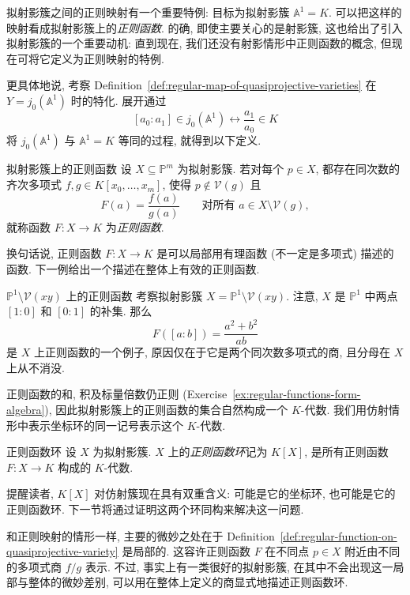 拟射影簇之间的正则映射有一个重要特例: 目标为拟射影簇 $\mathbb{A}^{1}=K$. 可以把这样的映射看成拟射影簇上的\emph{正则函数}. 的确, 即使主要关心的是射影簇, 这也给出了引入拟射影簇的一个重要动机: 直到现在, 我们还没有射影情形中正则函数的概念, 但现在可将它定义为正则映射的特例.

更具体地说, 考察 Definition~\ref{def:regular-map-of-quasiprojective-varieties} 在 $Y=j_{0}(\mathbb{A}^{1})$ 时的特化. 展开通过
\[
  [a_{0}:a_{1}]\in j_{0}(\mathbb{A}^{1})\longleftrightarrow\frac{a_{1}}{a_{0}}\in K
\]
将 $j_{0}(\mathbb{A}^{1})$ 与 $\mathbb{A}^{1}=K$ 等同的过程, 就得到以下定义.

\begin{Definition}{拟射影簇上的正则函数}\leavevmode\label{def:regular-function-on-quasiprojective-variety}
设 $X\subseteq\mathbb{P}^{m}$ 为拟射影簇. 若对每个 $p\in X$, 都存在同次数的齐次多项式 $f,g\in K[x_{0},\ldots,x_{m}]$, 使得 $p\notin\mathcal{V}(g)$ 且
\[
  F(a)=\frac{f(a)}{g(a)}\qquad\text{对所有 }a\in X\setminus\mathcal{V}(g),
\]
就称函数 $F:X\to K$ 为\emph{正则函数}.
\end{Definition}

换句话说, 正则函数 $F:X\to K$ 是可以局部用有理函数 (不一定是多项式) 描述的函数. 下一例给出一个描述在整体上有效的正则函数.

\begin{Example}{$\mathbb{P}^{1}\setminus\mathcal{V}(xy)$ 上的正则函数}\leavevmode\label{ex:regular-function-on-twice-punctured-projective-line}
考察拟射影簇 $X=\mathbb{P}^{1}\setminus\mathcal{V}(xy)$. 注意, $X$ 是 $\mathbb{P}^{1}$ 中两点 $[1:0]$ 和 $[0:1]$ 的补集. 那么
\[
  F([a:b])=\frac{a^{2}+b^{2}}{ab}
\]
是 $X$ 上正则函数的一个例子, 原因仅在于它是两个同次数多项式的商, 且分母在 $X$ 上从不消没.
\end{Example}

正则函数的和, 积及标量倍数仍正则 (Exercise~\ref{ex:regular-functions-form-algebra}), 因此拟射影簇上的正则函数的集合自然构成一个 $K$-代数. 我们用仿射情形中表示坐标环的同一记号表示这个 $K$-代数.

\begin{Definition}{正则函数环}\leavevmode\label{def:ring-of-regular-functions}
设 $X$ 为拟射影簇. $X$ 上的\emph{正则函数环}记为 $K[X]$, 是所有正则函数 $F:X\to K$ 构成的 $K$-代数.
\end{Definition}

提醒读者, $K[X]$ 对仿射簇现在具有双重含义: 可能是它的坐标环, 也可能是它的正则函数环. 下一节将通过证明这两个环同构来解决这一问题.

和正则映射的情形一样, 主要的微妙之处在于 Definition~\ref{def:regular-function-on-quasiprojective-variety} 是局部的. 这容许正则函数 $F$ 在不同点 $p\in X$ 附近由不同的多项式商 $f/g$ 表示. 不过, 事实上有一类很好的拟射影簇, 在其中不会出现这一局部与整体的微妙差别, 可以用在整体上定义的商显式地描述正则函数环.

